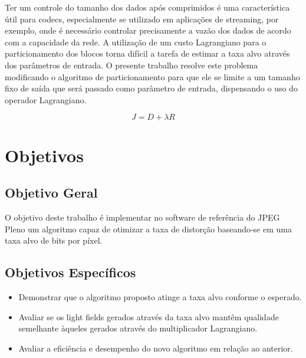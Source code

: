 Ter um controle do tamanho dos dados após comprimidos é uma característica útil para codecs, especialmente se utilizado em aplicações de streaming, 
por exemplo, onde é necessário controlar precisamente a vazão dos dados de acordo com a capacidade da rede. A utilização de um custo Lagrangiano
para o particionamento dos blocos torna difícil a tarefa de estimar a taxa alvo através dos parâmetros de entrada. O presente trabalho 
resolve este problema modificando o algoritmo de particionamento para que ele se limite a um tamanho fixo de saída que será passado como parâmetro
de entrada, dispensando o uso do operador Lagrangiano.


\begin{equation}
    \label{eqn:lagrangian_cost}
    J = D + \lambda R
\end{equation}


\section{Objetivos}
    \subsection{Objetivo Geral}
        O objetivo deste trabalho é implementar no software de referência do JPEG Pleno um algoritmo capaz de otimizar 
        a taxa de distorção baseando-se em uma taxa alvo de bits por píxel.
    
    \subsection{Objetivos Específicos}
        \begin{itemize}
            \item Demonstrar que o algoritmo proposto atinge a taxa alvo conforme o esperado.
            \item Avaliar se os light fields gerados através da taxa alvo mantêm qualidade semelhante àqueles gerados através do multiplicador
            Lagrangiano.
            \item Avaliar a eficiência e desempenho do novo algoritmo em relação ao anterior.
        \end{itemize}

